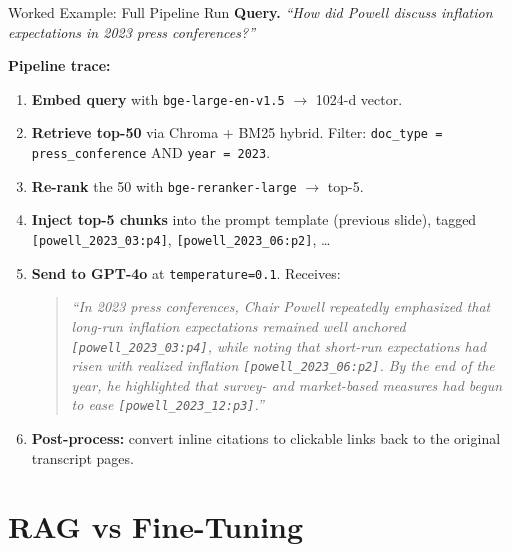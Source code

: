 \begin{frame}{Worked Example: Full Pipeline Run}
\textbf{Query.} \emph{``How did Powell discuss inflation expectations in 2023 press conferences?''}

\medskip
\textbf{Pipeline trace:}
\begin{enumerate}
\item \textbf{Embed query} with \texttt{bge-large-en-v1.5} $\to$ 1024-d vector.
\medskip
\item \textbf{Retrieve top-50} via Chroma + BM25 hybrid. Filter: \texttt{doc\_type = press\_conference} AND \texttt{year = 2023}.
\medskip
\item \textbf{Re-rank} the 50 with \texttt{bge-reranker-large} $\to$ top-5.
\medskip
\item \textbf{Inject top-5 chunks} into the prompt template (previous slide), tagged \texttt{[powell\_2023\_03:p4]}, \texttt{[powell\_2023\_06:p2]}, \dots
\medskip
\item \textbf{Send to GPT-4o} at \texttt{temperature=0.1}. Receives:
\begin{quote}
\small\itshape
``In 2023 press conferences, Chair Powell repeatedly emphasized that long-run inflation expectations remained well anchored \texttt{[powell\_2023\_03:p4]}, while noting that short-run expectations had risen with realized inflation \texttt{[powell\_2023\_06:p2]}. By the end of the year, he highlighted that survey- and market-based measures had begun to ease \texttt{[powell\_2023\_12:p3]}.''
\end{quote}
\medskip
\item \textbf{Post-process:} convert inline citations to clickable links back to the original transcript pages.
\end{enumerate}
\end{frame}

\section{RAG vs Fine-Tuning}

